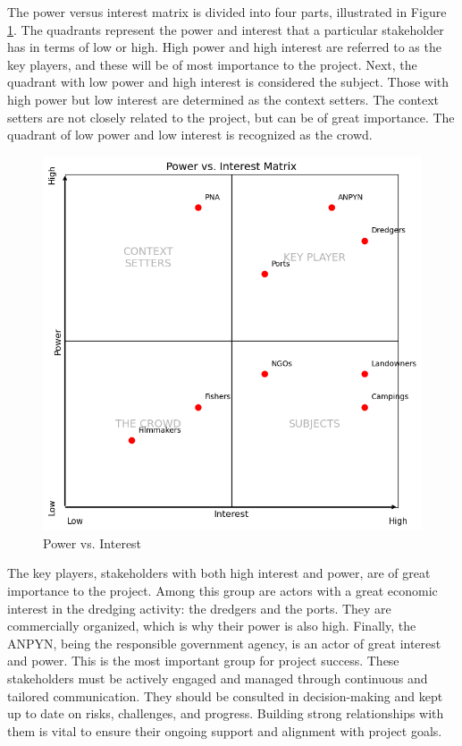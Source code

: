 The power versus interest matrix is divided into four parts, illustrated in Figure \ref{fig:power-interest}. The quadrants represent the power and interest that a particular stakeholder has in terms of low or high. High power and high interest are referred to as the key players, and these will be of most importance to the project. Next, the quadrant with low power and high interest is considered the subject. Those with high power but low interest are determined as the context setters. The context setters are not closely related to the project, but can be of great importance. The quadrant of low power and low interest is recognized as the crowd.

\begin{figure}[H]
    \centering
    \includegraphics[width=0.65\linewidth]{figures/ch3/PowerVSInterest.png}
    \caption{Power vs. Interest}
    \label{fig:power-interest}
\end{figure}

The key players, stakeholders with both high interest and power, are of great importance to the project. Among this group are actors with a great economic interest in the dredging activity: the dredgers and the ports. They are commercially organized, which is why their power is also high. Finally, the ANPYN, being the responsible government agency, is an actor of great interest and power. This is the most important group for project success. These stakeholders must be actively engaged and managed through continuous and tailored communication. They should be consulted in decision-making and kept up to date on risks, challenges, and progress. Building strong relationships with them is vital to ensure their ongoing support and alignment with project goals.


